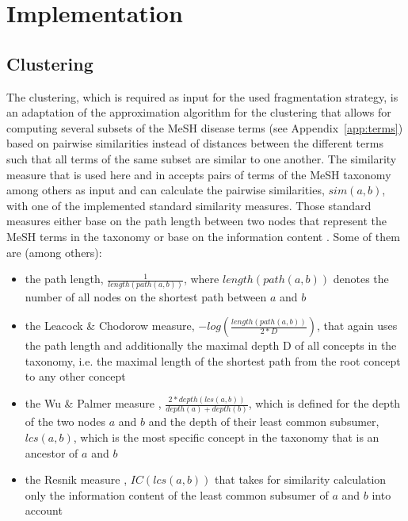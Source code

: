 
\section{Implementation}
\label{sec:impl}




\subsection{Clustering}
\label{sec:impl_clust}

The clustering, which is required as input for the used fragmentation strategy, is an adaptation of the approximation algorithm 
\citep{Gonzales1985} for the clustering that allows for computing several subsets of the MeSH disease terms (see Appendix~\ref{app:terms}) based on pairwise 
similarities instead of distances between the different terms such that all terms of the same subset are similar to one another. The similarity measure 
\citep{McInnes2009} that is used here and in \citet{Wiese2014} accepts pairs of terms of the MeSH taxonomy among others as input and can calculate the
pairwise similarities, $sim(a,b)$, with one of the implemented standard similarity measures. Those standard measures either base on the path length between
two nodes that represent the MeSH terms in the taxonomy or base on the information content \citep{Resnik1995}. Some of them are (among others):
\begin{itemize}
    \item the path length, $\frac{1}{length(path(a,b))}$, where $length(path(a,b))$ denotes the number of all nodes on the shortest path between $a$ and $b$
    \item the Leacock \& Chodorow measure, $-log(\frac{length(path(a,b))}{2*D})$, that again uses the path length and additionally the maximal depth D of all
        concepts in the taxonomy, i.e. the maximal length of the shortest path from the root concept to any other concept
    \item the Wu \& Palmer measure \citep{Wu1994}, $\frac{2*depth(lcs(a,b))}{depth(a)+depth(b)}$, which is defined for the depth of the two nodes $a$ and 
        $b$ and the depth of their least common subsumer, $lcs(a,b)$, which is the most specific concept in the taxonomy that is an ancestor of $a$ and $b$
    \item the Resnik measure \citep{Resnik1995}, $IC(lcs(a,b))$ that takes for similarity calculation only the information content of the least common 
        subsumer of $ a$ and $b$ into account
\end{itemize}

